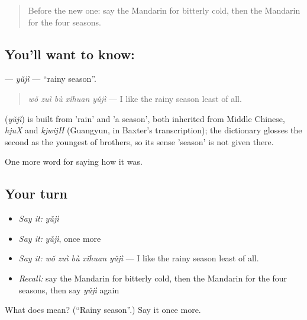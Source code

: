 \label{lesson:ZH-C515-yuji}



\begin{quote}
Before the new one: say the Mandarin for bitterly cold, then the Mandarin for the four seasons.
\end{quote}

\subsection*{You'll want to know: }
\textbf{} — \emph{yǔjì} — \textquotedblleft{}rainy season\textquotedblright{}.

\begin{quote}
\textbf{} \emph{wǒ zuì bù xǐhuan yǔjì} — I like the rainy season least of all.
\end{quote}

\begin{cousinweb}
\textbf{} (\emph{yǔjì}) is built from  'rain' and  'a season', both inherited from Middle Chinese, \emph{hjuX} and \emph{kjwijH} (Guangyun, in Baxter's transcription); the dictionary glosses the second as the youngest of brothers, so its sense 'season' is not given there.
\end{cousinweb}

\begin{grammarlens}[title={What you've built}]
One more word for saying how it was.
\end{grammarlens}

\subsection*{Your turn}
\begin{itemize}
\raggedright
  \item \emph{Say it:} \emph{yǔjì}
  \item \emph{Say it:} \emph{yǔjì}, once more
  \item \emph{Say it:} \emph{wǒ zuì bù xǐhuan yǔjì} — I like the rainy season least of all.
  \item \emph{Recall:} say the Mandarin for bitterly cold, then the Mandarin for the four seasons, then say \emph{yǔjì} again
\end{itemize}

\begin{tcolorbox}[breakable,colback=teal!4,colframe=teal!35!black,title={Before you move on}]
What does  mean? (\textquotedblleft{}Rainy season\textquotedblright{}.) Say it once more.
\end{tcolorbox}
